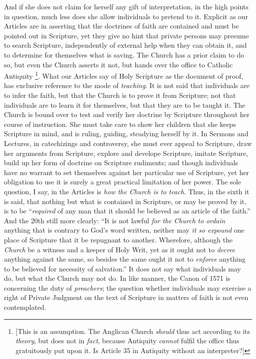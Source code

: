 And if she does not claim for herself any gift of interpretation,
in the high points in question, much less does she allow
individuals to pretend to it. Explicit as our Articles are in
asserting that the doctrines of faith are contained and must be
pointed out in Scripture, yet they give no hint that private persons
may presume to search Scripture, independently of external help when
they can obtain it, and to determine for themselves what is saving.
The Church has a prior claim to do so, but even the Church asserts it
not, but hands over the office to Catholic Antiquity \footnote{[This is an assumption. The Anglican Church \emph{should}
thus act according to its \emph{theory}, but does not in \emph{fact}, because
Antiquity \emph{cannot} fulfil the office thus gratuitously put upon it. Is
Article 35 in Antiquity without an interpreter?]}. What our Articles say of Holy Scripture as the document of
proof, has exclusive reference to the mode of \emph{teaching}. It is
not said that individuals are to infer the faith, but that the Church
is to prove it from Scripture; not that individuals are to learn it
for themselves, but that they are to be taught it. The Church is bound
over to test and verify her doctrine by Scripture throughout her
course of instruction. She must take care to show her children that
she keeps Scripture in mind, and is ruling, guiding, steadying herself
by it. In Sermons and Lectures, in catechizings and controversy, she
must ever appeal to Scripture, draw her arguments from Scripture,
explore and develope Scripture, imitate Scripture, build up her form
of doctrine on Scripture rudiments; and though individuals have no
warrant to set themselves against her particular use of Scripture, yet
her obligation to use it is surely a great practical limitation of her
power. The sole question, I say, in the Articles is \emph{how the Church
is to teach}. Thus, in the sixth it is said, that nothing but what
is contained in Scripture, or may be proved by it, is to be ``\emph{required}
of any man that it should be believed as an article of the
faith.'' And the 20th still more clearly: ``It is not
lawful \emph{for the Church to ordain} anything that is contrary to
God's word written, neither may \emph{it so expound} one place of
Scripture that it be repugnant to another. Wherefore, although the \emph{Church}
be a witness and a keeper of Holy Writ, yet as it ought not to \emph{decree}
anything against the same, so besides the same ought it not to \emph{enforce}
anything to be believed for necessity of salvation.'' It does not
say what individuals may do, but what the Church may not do. In like
manner, the Canon of 1571 is concerning the duty of \emph{preachers};
the question whether individuals may exercise a right of Private
Judgment on the text of Scripture in matters of faith is not even
contemplated.

